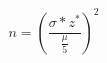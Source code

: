 \documentclass[preview]{standalone}
\begin{document}
\begin{equation}
	n = \left( \frac{\sigma * z^*}{\frac{\mu}{5}}\right) ^2
\end{equation}
\end{document}
